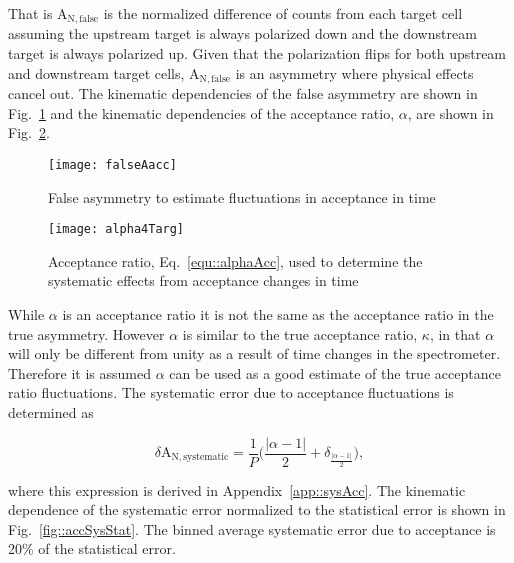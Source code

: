 \noindent
That is A$_{\mathrm{N,false}}$ is the normalized difference of counts from each
target cell assuming the upstream target is always polarized down and the
downstream target is always polarized up.  Given that the polarization flips for
both upstream and downstream target cells, A$_{\mathrm{N,false}}$ is an
asymmetry where physical effects cancel out.  The kinematic dependencies of the
false asymmetry are shown in Fig.~\ref{fig::falseAacc} and the kinematic
dependencies of the acceptance ratio, $\alpha$, are shown in
Fig.~\ref{fig::alpha}.

\begin{figure}[h!t]
  \begin{center}
    \texttt{[image: falseAacc]}
    \caption{False asymmetry to estimate fluctuations in acceptance in time}
    \label{fig::falseAacc}
  \end{center}
\end{figure}

\begin{figure}[h!t]
  \begin{center}
    \texttt{[image: alpha4Targ]}
    \caption{Acceptance ratio, Eq.~\ref{equ::alphaAcc}, used to determine the
      systematic effects from acceptance changes in time}
    \label{fig::alpha}
  \end{center}
\end{figure}

While $\alpha$ is an acceptance ratio it is not the same as the acceptance ratio
in the true asymmetry.  However $\alpha$ is similar to the true acceptance
ratio, $\kappa$, in that $\alpha$ will only be different from unity as a result
of time changes in the spectrometer.  Therefore it is assumed $\alpha$ can be
used as a good estimate of the true acceptance ratio fluctuations.  The
systematic error due to acceptance fluctuations is determined as

\begin{equation}
  \delta\mathrm{A}_{\mathrm{N,systematic}} =
  \frac{1}{P} \Big(\frac{|\alpha-1|}{2} + \delta_{\frac{|\alpha-1|}{2}} \Big),
\end{equation}

\noindent
where this expression is derived in Appendix~\ref{app::sysAcc}.  The kinematic
dependence of the systematic error normalized to the statistical error is shown
in Fig.~\ref{fig::accSysStat}.  The binned average systematic error due to
acceptance is 20\% of the statistical error.


